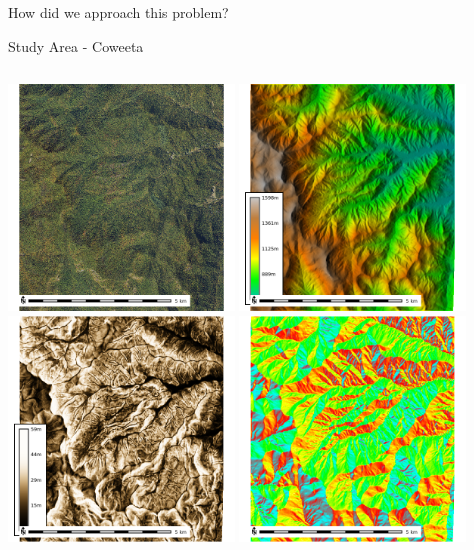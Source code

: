 \documentclass[
  ignorenonframetext,
]{beamer}
\begin{document}
\begin{frame}[fragile]{How did we approach this problem?}
\begin{block}{Study Area - Coweeta}
\label{study-area---coweeta}
\begin{columns}[T]
\begin{column}{0.5\textwidth}
\includegraphics[width=0.45\textwidth,height=\textheight]{../output/coweeta//naip.png}
\includegraphics[width=0.45\textwidth,height=\textheight]{../output/coweeta/elev.png}
\includegraphics[width=0.45\textwidth,height=\textheight]{../output/coweeta/slope.png}
\includegraphics[width=0.45\textwidth,height=\textheight]{../output/coweeta/aspect.png}
\end{column}


\end{columns}
\end{block}
\end{frame}
\end{document}

